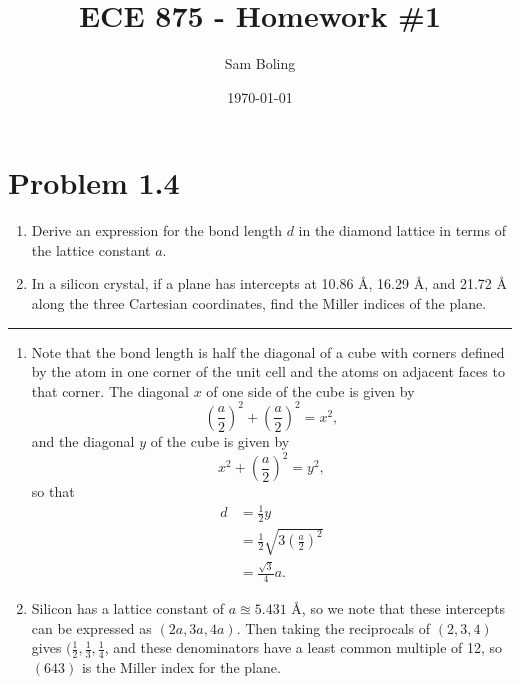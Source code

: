 \documentclass{article}
\title{ECE 875 - Homework \#1}
\author{Sam Boling}
\date{\today}
\newcommand{\horline}
           {\begin{center}
              \noindent\rule{8cm}{0.4pt}
            \end{center}}
\begin{document}
\maketitle

\section*{Problem 1.4}
\begin{enumerate}[label=(\alph*)]
  \item{Derive an expression for the bond length $d$ in the diamond lattice
        in terms of the lattice constant $a$.
       }
  \item{In a silicon crystal, if a plane has intercepts at 10.86 \r{A},
        16.29 \r{A}, and 21.72 \r{A} along the three Cartesian coordinates,
        find the Miller indices of the plane.
       }
\end{enumerate}

\horline

\begin{enumerate}[label=(\alph*)]
  \item{Note that the bond length is half the diagonal of a cube
        with corners defined by the atom in one corner of the 
        unit cell and the atoms on adjacent faces to that corner.
        The diagonal $x$ of one side of the cube is given by
        $$
        \left(\frac{a}{2}\right)^2 
      + \left(\frac{a}{2}\right)^2
      = x^2,
        $$ 
        and the diagonal $y$ of the cube is given by
        $$
        x^2 + \left(\frac{a}{2}\right)^2 = y^2,
        $$
        so that
        \begin{align*}
        d &= \frac{1}{2} y \\
          &= \frac{1}{2} \sqrt{3 \left(\frac{a}{2}\right)^2} \\
          &= \frac{\sqrt{3}}{4} a.
        \end{align*}
       }
  \item{Silicon has a lattice constant of $a \approxeq 5.431$ \r{A}, 
        so we note that these intercepts can be expressed as
        $(2a, 3a, 4a)$. Then taking the reciprocals of $(2,3,4)$ gives
        $(\frac{1}{2}, \frac{1}{3}, \frac{1}{4}$, and these denominators
        have a least common multiple of 12, so
        $(643)$ is the Miller index for the plane.
       }
\end{enumerate}

\pagebreak
\end{document}
